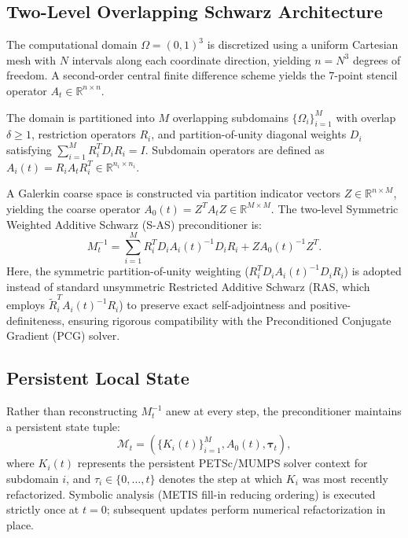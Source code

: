 \documentclass[preprint,12pt,3p]{elsarticle}
\begin{document}
\subsection{Two-Level Overlapping Schwarz Architecture}
The computational domain $\Omega = (0, 1)^3$ is discretized using a uniform Cartesian mesh with $N$ intervals along each coordinate direction, yielding $n = N^3$ degrees of freedom. A second-order central finite difference scheme yields the 7-point stencil operator $A_t \in \mathbb{R}^{n \times n}$.

The domain is partitioned into $M$ overlapping subdomains $\{\Omega_i\}_{i=1}^M$ with overlap $\delta \ge 1$, restriction operators $R_i$, and partition-of-unity diagonal weights $D_i$ satisfying $\sum_{i=1}^M R_i^T D_i R_i = I$. Subdomain operators are defined as $A_i(t) = R_i A_t R_i^T \in \mathbb{R}^{n_i \times n_i}$.

A Galerkin coarse space is constructed via partition indicator vectors $Z \in \mathbb{R}^{n \times M}$, yielding the coarse operator $A_0(t) = Z^T A_t Z \in \mathbb{R}^{M \times M}$. The two-level Symmetric Weighted Additive Schwarz (S-AS) preconditioner is:
\begin{equation}
M_t^{-1} = \sum_{i=1}^M R_i^T D_i A_i(t)^{-1} D_i R_i + Z A_0(t)^{-1} Z^T.
\label{eq:two_level_prec}
\end{equation}
Here, the symmetric partition-of-unity weighting ($R_i^T D_i A_i(t)^{-1} D_i R_i$) is adopted instead of standard unsymmetric Restricted Additive Schwarz (RAS, which employs $\tilde{R}_i^T A_i(t)^{-1} R_i$) to preserve exact self-adjointness and positive-definiteness, ensuring rigorous compatibility with the Preconditioned Conjugate Gradient (PCG) solver.

\subsection{Persistent Local State}
Rather than reconstructing $M_t^{-1}$ anew at every step, the preconditioner maintains a persistent state tuple:
\begin{equation}
\mathcal{M}_t = \left( \{K_i(t)\}_{i=1}^M, A_0(t), \boldsymbol{\tau}_t \right),
\label{eq:state_tuple}
\end{equation}
where $K_i(t)$ represents the persistent PETSc/MUMPS solver context for subdomain $i$, and $\tau_i \in \{0, \dots, t\}$ denotes the step at which $K_i$ was most recently refactorized. Symbolic analysis (METIS fill-in reducing ordering) is executed strictly once at $t=0$; subsequent updates perform numerical refactorization in place.
\end{document}
